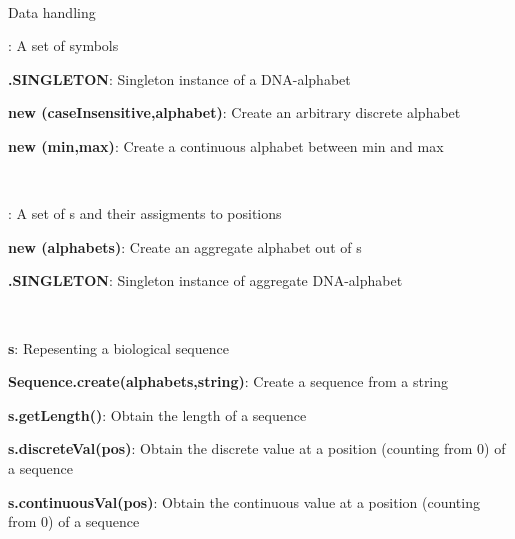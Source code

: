 \documentclass[10pt]{scrartcl}
\newcommand{\entry}[3]{{\bfseries #1#2}: #3}
\begin{document}
\thispagestyle{empty}


\renewcommand{\section}[1]{{
~\vspace{-0.1cm}

\large\sfb #1\vspace{0.1cm}\\}


}
\begin{flushleft}
\footnotesize
\section{Data handling}

\entry{\DNAAlphabet}{}{A set of symbols}

\entry{\DNAAlphabet}{.SINGLETON}{Singleton instance of a DNA-alphabet}

\entry{new \DiscreteAlphabet}{(caseInsensitive,alphabet)}{Create an arbitrary discrete alphabet}

\entry{new \ContinuousAlphabet}{(min,max)}{Create a continuous alphabet between min and max}

~

\entry{\AlphabetContainer}{}{A set of \Alphabet s and their assigments to positions}

\entry{new \AlphabetContainer}{(alphabets)}{Create an aggregate alphabet out of \Alphabet s}

\entry{\DNAAlphabetContainer}{.SINGLETON}{Singleton instance of aggregate DNA-alphabet}


~

\entry{\Sequence}{ s}{Repesenting a biological sequence}

\entry{Sequence}{.create(alphabets,string)}{Create a sequence from a string}

\entry{s}{.getLength()}{Obtain the length of a sequence}

\entry{s}{.discreteVal(pos)}{Obtain the discrete value at a position (counting from 0) of a sequence}

\entry{s}{.continuousVal(pos)}{Obtain the continuous value at a position (counting from 0) of a sequence}

~


\end{flushleft}
\end{document}
